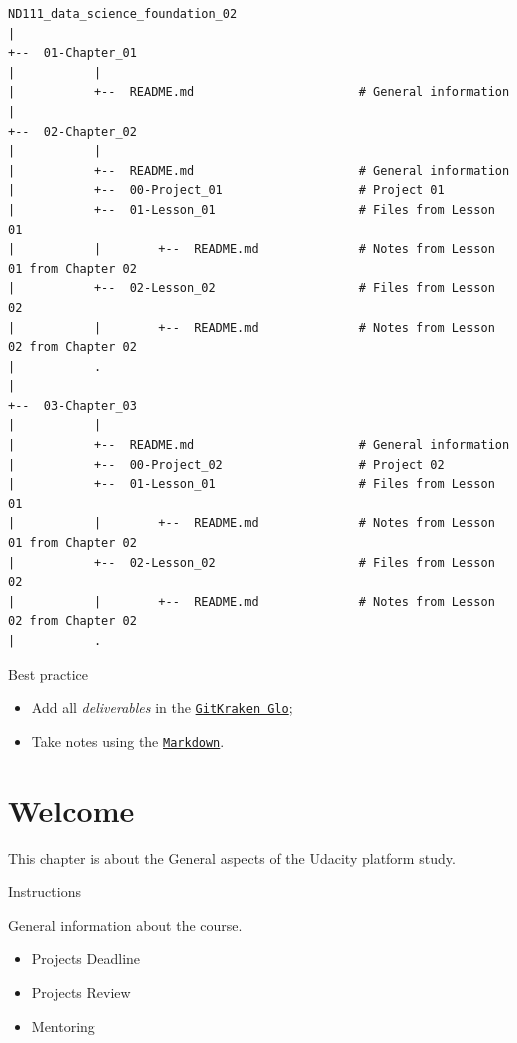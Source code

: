 \documentclass[]{book}
\providecommand{\tightlist}{%
  \setlength{\itemsep}{0pt}\setlength{\parskip}{0pt}}
\begin{document}
\begin{verbatim}
ND111_data_science_foundation_02
|
+--  01-Chapter_01
|           |
|           +--  README.md                       # General information
|
+--  02-Chapter_02
|           |
|           +--  README.md                       # General information
|           +--  00-Project_01                   # Project 01
|           +--  01-Lesson_01                    # Files from Lesson 01
|           |        +--  README.md              # Notes from Lesson 01 from Chapter 02
|           +--  02-Lesson_02                    # Files from Lesson 02
|           |        +--  README.md              # Notes from Lesson 02 from Chapter 02
|           .
|
+--  03-Chapter_03
|           |
|           +--  README.md                       # General information
|           +--  00-Project_02                   # Project 02
|           +--  01-Lesson_01                    # Files from Lesson 01
|           |        +--  README.md              # Notes from Lesson 01 from Chapter 02
|           +--  02-Lesson_02                    # Files from Lesson 02
|           |        +--  README.md              # Notes from Lesson 02 from Chapter 02
|           .
\end{verbatim}

Best practice

\begin{itemize}
\tightlist
\item
  Add all \emph{deliverables} in the
  \href{https://www.gitkraken.com/invite/5Ua2spL4}{\texttt{GitKraken\ Glo}};
\item
  Take notes using the
  \href{https://github.com/adam-p/markdown-here/wiki/Markdown-Cheatsheet}{\texttt{Markdown}}.
\end{itemize}

\chapter{Welcome}\label{intro}

This chapter is about the General aspects of the Udacity platform study.

Instructions

General information about the course.

\begin{itemize}
\tightlist
\item
  Projects Deadline
\item
  Projects Review
\item
  Mentoring
\end{itemize}
\end{document}
